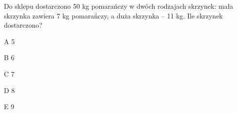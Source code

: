 \begin{tresc}
Do sklepu dostarczono 50 kg pomarańczy w dwóch rodzajach skrzynek: mała skrzynka zawiera 7 kg pomarańczy, a duża skrzynka – 11 kg. Ile skrzynek dostarczono?
\end{tresc}
\begin{wariant}{A} 5 \end{wariant}
\begin{wariant}{B} 6 \end{wariant}
\begin{wariant}{C} 7 \end{wariant}
\begin{wariant}{D} 8 \end{wariant}
\begin{wariant}{E} 9 \end{wariant}
